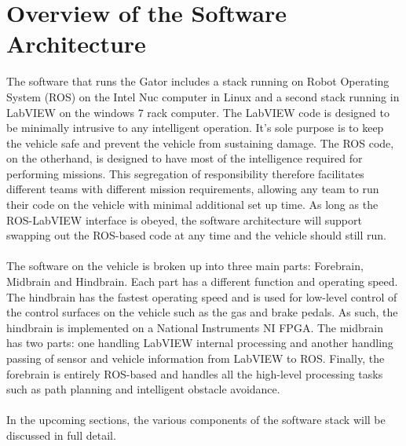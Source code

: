 \documentclass[12pt]{article}
\begin{document}
\renewcommand{\thefootnote}{\arabic{footnote}}



\tableofcontents

\newpage

\listoffigures

\newpage

\listoftables

\newpage

\newpage

\newpage

\newpage

\section{Overview of the Software Architecture}
The software that runs the Gator includes a stack running on Robot Operating System (ROS) on the Intel Nuc computer in Linux and a second stack running in LabVIEW on the windows 7 rack computer. The LabVIEW code is designed to be minimally intrusive to any intelligent operation. It's sole purpose is to keep the vehicle safe and prevent the vehicle from sustaining damage. The ROS code, on the otherhand, is designed to have most of the intelligence required for performing missions. This segregation of responsibility therefore facilitates different teams with different mission requirements, allowing any team to run their code on the vehicle with minimal additional set up time. As long as the ROS-LabVIEW interface is obeyed, the software architecture will support swapping out the ROS-based code at any time and the vehicle should still run.\\ \\
%
\noindent The software on the vehicle is broken up into three main parts: Forebrain, Midbrain and Hindbrain. Each part has a different function and operating speed. The hindbrain has the fastest operating speed and is used for low-level control of the control surfaces on the vehicle such as the gas and brake pedals. As such, the hindbrain is implemented on a National Instruments NI FPGA. The midbrain has two parts: one handling LabVIEW internal processing and another handling passing of sensor and vehicle information from LabVIEW to ROS. Finally, the forebrain is entirely ROS-based and handles all the high-level processing tasks such as path planning and intelligent obstacle avoidance. \\ \\
%
In the upcoming sections, the various components of the software stack will be discussed in full detail.

\newpage

\newpage

\newpage

\newpage

\end{document}
